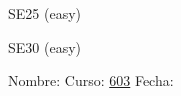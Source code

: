 \documentclass[landscape,letterpaper,10pt]{article}
\title{}
\author{Germán Avendaño Ramírez}
\begin{document}
\begin{minipage}{0.5\textwidth}
\begin{minipage}{0.95\linewidth}\begin{center}
SE25 (easy) \\
\end{center}\end{minipage}
\end{minipage}\hfill
\begin{minipage}{.5\textwidth}
\begin{minipage}{0.95\linewidth}\begin{center}
SE30 (easy) \\
\end{center}\end{minipage}
\end{minipage}
Nombre: \hrulefill Curso: \underline{603} Fecha: \underline{\hspace{50pt}}
\end{document}
